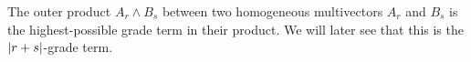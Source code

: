 \begin{definition}\label{d:outer-product1}
	The outer product $A_r \wedge B_s$ between two homogeneous multivectors $A_r$ and $B_s$ is the highest-possible grade term in their product. We will later see that this is the $\left|r+s\right|$-grade term.
\end{definition}
